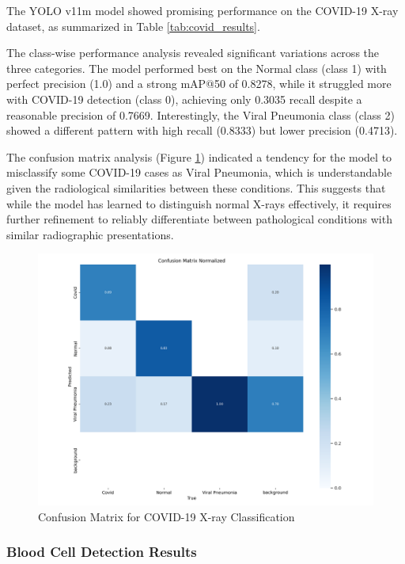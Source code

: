 \begin{multicols}{2}
The YOLO v11m model showed promising performance on the COVID-19 X-ray dataset, as summarized in Table \ref{tab:covid_results}.

The class-wise performance analysis revealed significant variations across the three categories. The model performed best on the Normal class (class 1) with perfect precision (1.0) and a strong mAP@50 of 0.8278, while it struggled more with COVID-19 detection (class 0), achieving only 0.3035 recall despite a reasonable precision of 0.7669. Interestingly, the Viral Pneumonia class (class 2) showed a different pattern with high recall (0.8333) but lower precision (0.4713).
\end{multicols}

\begin{multicols}{2}
The confusion matrix analysis (Figure \ref{fig:covid_confusion}) indicated a tendency for the model to misclassify some COVID-19 cases as Viral Pneumonia, which is understandable given the radiological similarities between these conditions. This suggests that while the model has learned to distinguish normal X-rays effectively, it requires further refinement to reliably differentiate between pathological conditions with similar radiographic presentations.
\end{multicols}

\begin{figure}[ht]
\centering
\includegraphics[width=0.8\linewidth]{datas/x_ray_summary_datas/x_ray_confusion_matrix_normalized.png}
\caption{Confusion Matrix for COVID-19 X-ray Classification}
\label{fig:covid_confusion}
\end{figure}

\subsubsection{Blood Cell Detection Results}

